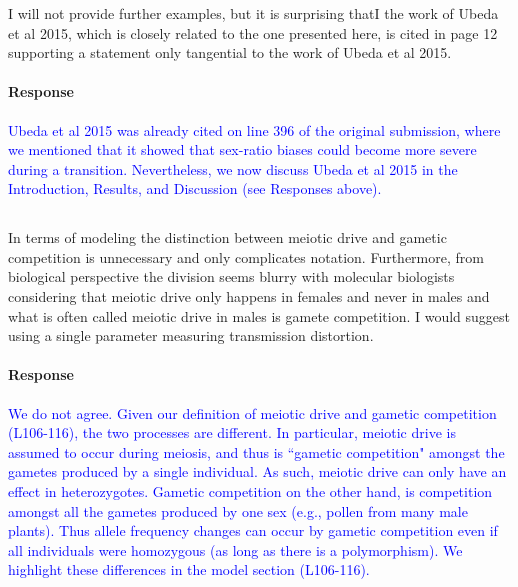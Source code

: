 \documentclass[10pt,letterpaper]{article}
\begin{document}
\noindent\subsubsection{}
I will not provide further examples, but it is surprising thatI the work of Ubeda et al 2015, which is closely related to the one presented here, is cited in page 12 supporting a statement only tangential to the work of Ubeda et al 2015.

\noindent\paragraph{Response}
\textcolor{blue}{Ubeda et al 2015 was already cited on line 396 of the original submission, where we mentioned that it showed that sex-ratio biases could become more severe during a transition.
Nevertheless, we now discuss Ubeda et al 2015 in the Introduction, Results, and Discussion (see Responses above).}

\noindent\subsection{}
In terms of modeling the distinction between meiotic drive and gametic competition is unnecessary and only complicates notation. Furthermore, from biological perspective the division seems blurry with molecular biologists considering that meiotic drive only happens in females and never in males and what is often called meiotic drive in males is gamete competition. I would suggest using a single parameter measuring transmission distortion.

\noindent\paragraph{Response}
\textcolor{blue}{We do not agree. 
Given our definition of meiotic drive and gametic competition (L106-116), the two processes are different.
In particular, meiotic drive is assumed to occur during meiosis, and thus is ``gametic competition" amongst the gametes produced by a single individual. 
As such, meiotic drive can only have an effect in heterozygotes.
Gametic competition on the other hand, is competition amongst all the gametes produced by one sex (e.g., pollen from many male plants).
Thus allele frequency changes can occur by gametic competition even if all individuals were homozygous (as long as there is a polymorphism).
We highlight these differences in the model section (L106-116).
}
\end{document}
